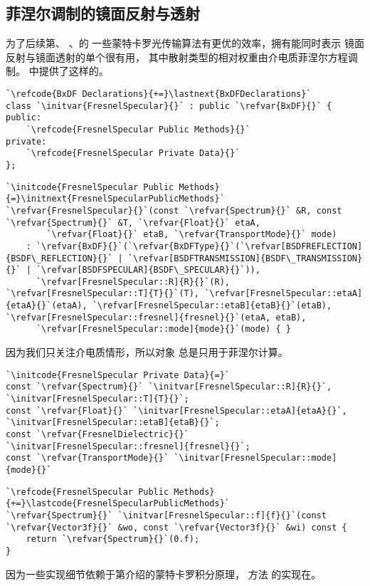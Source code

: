 \subsection{菲涅尔调制的镜面反射与透射}\label{sub:菲涅尔调制的镜面反射与透射}
为了后续第、
、的
一些蒙特卡罗光传输算法有更优的效率，拥有能同时表示
镜面反射与镜面透射的单个很有用，
其中散射类型的相对权重由介电质菲涅尔方程调制。
中提供了这样的。
\begin{lstlisting}
`\refcode{BxDF Declarations}{+=}\lastnext{BxDFDeclarations}`
class `\initvar{FresnelSpecular}{}` : public `\refvar{BxDF}{}` {
public:
    `\refcode{FresnelSpecular Public Methods}{}`
private:
    `\refcode{FresnelSpecular Private Data}{}`
};
\end{lstlisting}
\begin{lstlisting}
`\initcode{FresnelSpecular Public Methods}{=}\initnext{FresnelSpecularPublicMethods}`
`\refvar{FresnelSpecular}{}`(const `\refvar{Spectrum}{}` &R, const `\refvar{Spectrum}{}` &T, `\refvar{Float}{}` etaA,
        `\refvar{Float}{}` etaB, `\refvar{TransportMode}{}` mode) 
    : `\refvar{BxDF}{}`(`\refvar{BxDFType}{}`(`\refvar[BSDFREFLECTION]{BSDF\_REFLECTION}{}` | `\refvar[BSDFTRANSMISSION]{BSDF\_TRANSMISSION}{}` | `\refvar[BSDFSPECULAR]{BSDF\_SPECULAR}{}`)),
      `\refvar[FresnelSpecular::R]{R}{}`(R), `\refvar[FresnelSpecular::T]{T}{}`(T), `\refvar[FresnelSpecular::etaA]{etaA}{}`(etaA), `\refvar[FresnelSpecular::etaB]{etaB}{}`(etaB), `\refvar[FresnelSpecular::fresnel]{fresnel}{}`(etaA, etaB),
      `\refvar[FresnelSpecular::mode]{mode}{}`(mode) { }
\end{lstlisting}

因为我们只关注介电质情形，所以对象
总是只用于菲涅尔计算。

\begin{lstlisting}
`\initcode{FresnelSpecular Private Data}{=}`
const `\refvar{Spectrum}{}` `\initvar[FresnelSpecular::R]{R}{}`, `\initvar[FresnelSpecular::T]{T}{}`;
const `\refvar{Float}{}` `\initvar[FresnelSpecular::etaA]{etaA}{}`, `\initvar[FresnelSpecular::etaB]{etaB}{}`;
const `\refvar{FresnelDielectric}{}` `\initvar[FresnelSpecular::fresnel]{fresnel}{}`;
const `\refvar{TransportMode}{}` `\initvar[FresnelSpecular::mode]{mode}{}`
\end{lstlisting}
\begin{lstlisting}
`\refcode{FresnelSpecular Public Methods}{+=}\lastcode{FresnelSpecularPublicMethods}`
`\refvar{Spectrum}{}` `\initvar[FresnelSpecular::f]{f}{}`(const `\refvar{Vector3f}{}` &wo, const `\refvar{Vector3f}{}` &wi) const { 
    return `\refvar{Spectrum}{}`(0.f); 
}
\end{lstlisting}

因为一些实现细节依赖于第介绍的蒙特卡罗积分原理，
方法
的实现在。